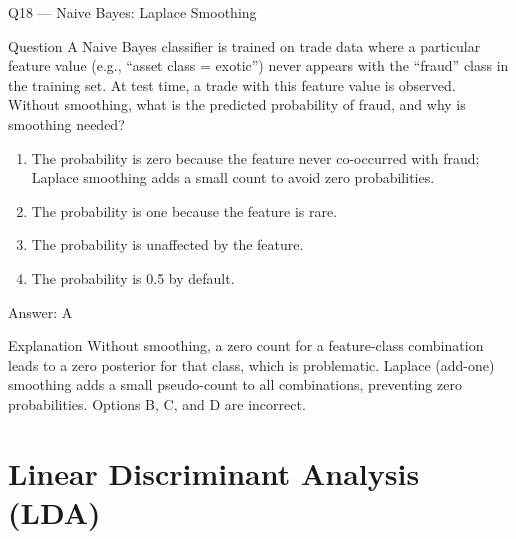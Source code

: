 \documentclass[aspectratio=169,8pt]{beamer}
\begin{document}
	\begin{frame}{Q18 --- Naive Bayes: Laplace Smoothing}
		\begin{block}{Question}
			A Naive Bayes classifier is trained on trade data where a particular feature value (e.g., ``asset class = exotic'') never appears with the ``fraud'' class in the training set. At test time, a trade with this feature value is observed. Without smoothing, what is the predicted probability of fraud, and why is smoothing needed?
			\begin{enumerate}
				\item The probability is zero because the feature never co-occurred with fraud; Laplace smoothing adds a small count to avoid zero probabilities.
				\item The probability is one because the feature is rare.
				\item The probability is unaffected by the feature.
				\item The probability is 0.5 by default.
			\end{enumerate}
		\end{block}
		\begin{exampleblock}{Answer: A}\end{exampleblock}
		\begin{block}{Explanation}
			Without smoothing, a zero count for a feature-class combination leads to a zero posterior for that class, which is problematic. Laplace (add-one) smoothing adds a small pseudo-count to all combinations, preventing zero probabilities. Options B, C, and D are incorrect.
		\end{block}
	\end{frame}
	
	\section{Linear Discriminant Analysis (LDA)}
	
\end{document}
